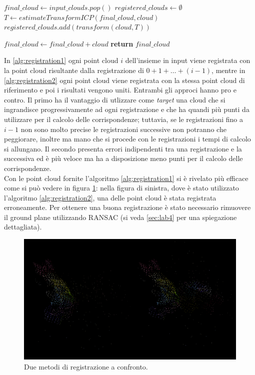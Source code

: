 \documentclass[a4paper]{article}
\begin{document}
	\begin{algorithm}
		\label{alg:registration2}
		\caption{}
		\begin{algorithmic}
				\State $final\_cloud \gets input\_clouds.pop()$	
				\State $registered\_clouds \gets \emptyset$
					\State $T \gets estimateTransformICP(final\_cloud, cloud)$
					\State $registered\_clouds.add(transform(cloud,T))$
				\EndFor
				
					\State $final\_cloud \gets final\_cloud + cloud$
				\EndFor
				\State \textbf{return} $final\_cloud$
			\EndFunction
		\end{algorithmic}
	\end{algorithm}

	In \ref{alg:registration1} ogni point cloud $i$ dell'insieme in input viene registrata con la point cloud risultante dalla registrazione di $0 + 1 + \dots + (i-1)$, mentre in \ref{alg:registration2} ogni point cloud viene registrata con la stessa point cloud di riferimento e poi i risultati vengono uniti. Entrambi gli approci hanno pro e contro. Il primo ha il vantaggio di utlizzare come \textit{target} una cloud che si ingrandisce progressivamente ad ogni registrazione e che ha quandi più punti da utilizzare per il calcolo delle corrispondenze; tuttavia, se le registrazioni fino a $i-1$ non sono molto precise le registrazioni successive non potranno che peggiorare, inoltre ma mano che si procede con le registrazioni i tempi di calcolo si allungano. Il secondo presenta errori indipendenti tra una registrazione e la successiva ed è più veloce ma ha a disposizione meno punti per il calcolo delle corrispondenze.\\
	Con le point cloud fornite l'algoritmo \ref{alg:registration1} si è rivelato più efficace come si può vedere in figura \ref{fig:lab3}: nella figura di sinistra, dove è stato utilizzato l'algoritmo \ref{alg:registration2}, una delle point cloud è stata registrata erroneamente. Per ottenere una buona registrazione è stato necessario rimuovere il ground plane utilizzando RANSAC (si veda \ref{sec:lab4} per una spiegazione dettagliata).
	

	\begin{figure}
		\centering
		\includegraphics[width=1\textwidth]{images/lab3.png}
		\caption{\label{fig:lab3}Due metodi di registrazione a confronto.}
	\end{figure}
\end{document}
